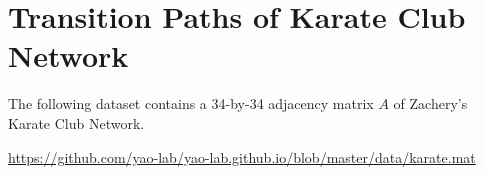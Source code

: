 \documentclass[11pt]{article}
\def\rank{{\mathrm{rank}}}
\begin{document}

\section{Transition Paths of Karate Club Network} 
The following dataset contains a 34-by-34 adjacency matrix $A$ of Zachery's Karate Club Network. 

\url{https://github.com/yao-lab/yao-lab.github.io/blob/master/data/karate.mat}
\end{document}
